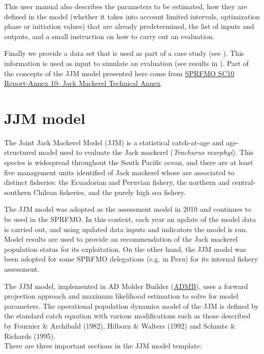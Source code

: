 \documentclass{article}
\begin{document}
This user manual also describes the parameters to be estimated, how they are defined in the model (whether it takes into account limited intervals, optimization phase or initiation values) that are already predetermined, the list of inputs and outputs, and a small instruction on how to carry out an evaluation.

Finally we provide a data set that is used as part of a case study (see ). This information is used as input to simulate an evaluation (see results in ).
Part of the concepts of the JJM model presented here come from \href{https://www.sprfmo.int/assets/Meetings/SC/10th-SC-2022/Report-and-Annexes/Annex-8-JM-Technical-Advice-CV_2.pdf}{SPRFMO SC10 Report-Annex 10- Jack Mackerel Technical Annex}.
\section{JJM model}
The Joint Jack Mackerel Model (JJM) is a statistical catch-at-age and age-structured model used to evaluate the Jack mackerel (\textit{Trachurus murphyi}). This species is widespread throughout the South Pacific ocean, and there are at least five management units identified of Jack mackerel whose are associated to distinct fisheries: the Ecuadorian and Peruvian fishery, the northern and central-southern Chilean fisheries, and the purely high sea fishery. 

The JJM model was adopted as the assessment model in 2010 and continues to be used in the SPRFMO. In this context, each year an update of the model data is carried out, and using updated data inputs and indicators the model is run. Model results are used to provide an recommendation of the Jack mackerel population status for its exploitation. On the other hand, the JJM model was been adopted for some SPRFMO delegations (e.g. in Peru) for its internal fishery assessment.

The JJM model, implemented in AD Molder Builder (\href{https://www.admb-project.org/}{ADMB}), uses a forward projection approach and maximum likelihood estimation to solve for model parameters. The operational population dynamics model of the JJM is defined by the standard catch equation with various modifications such as those described by Fournier \& Archibald (1982), Hilborn \& Walters (1992) and Schnute \& Richards (1995)\cite{sc10report}.\\


There are three important sections in the JJM model template\cite{admbmanual}:
\end{document}
